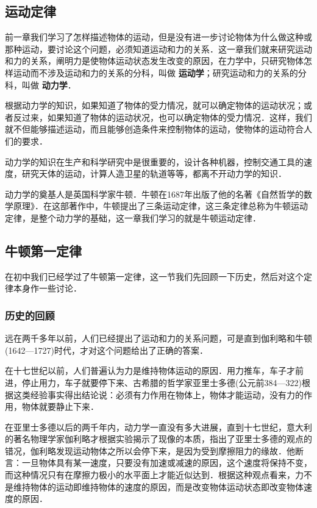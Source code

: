 
\begin{Test}

\chapter{运动定律}

前一章我们学习了怎样描述物体的运动，但是没有进一步讨论物体为什么做这种或那种运动，要讨论这个问题，必须知道运动和力的关系．这一章我们就来研究运动和力的关系，阐明力是使物体运动状态发生改变的原因，在力学中，只研究物体怎样运动而不涉及运动和力的关系的分科，叫做\textbf{ 运动学}；研究运动和力的关系的分科，叫做\textbf{ 动力学}．

根据动力学的知识，如果知道了物体的受力情况，就可以确定物体的运动状况；或者反过来，如果知道了物体的运动状况，也可以确定物体的受力情况．这样，我们就不但能够描述运动，而且能够创造条件来控制物体的运动，使物体的运动符合人们的要求．

动力学的知识在生产和科学研究中是很重要的，设计各种机器，控制交通工具的速度，研究天体的运动，计算人造卫星的轨道等等，都离不开动力学的知识．

动力学的奠基人是英国科学家牛顿．牛顿在1687年出版了他的名著《自然哲学的数学原理》．在这部著作中，牛顿提出了三条运动定律，这三条定律总称为牛顿运动定律，是整个动力学的基础，这一章我们学习的就是牛顿运动定律．

\section{牛顿第一定律}
在初中我们已经学过了牛顿第一定律，这一节我们先回顾一下历史，然后对这个定律本身作一些讨论．

\subsection{历史的回顾}
远在两千多年以前，人们已经提出了运动和力的关系问题，可是直到伽利略和牛顿(1642—1727)时代，才对这个问题给出了正确的答案．

在十七世纪以前，人们普遍认为力是维持物体运动的原因．用力推车，车子才前进，停止用力，车子就要停下来、古希腊的哲学家亚里士多德(公元前384—322)根据这类经验事实得出结论说：必须有力作用在物体上，物体才能运动，没有力的作用，物体就要静止下来．

在亚里士多德以后的两千年内，动力学一直没有多大进展，直到十七世纪，意大利的著名物理学家伽利略才根据实验揭示了现像的本质，指出了亚里士多德的观点的错况，伽利略发现运动物体之所以会停下来，是因为受到摩擦阻力的缘故．他断言：一旦物体具有某一速度，只要没有加速或减速的原因，这个速度将保持不变，而这种情况只有在摩擦力极小的水平面上才能近似达到．根据这种观点看来，力不是维持物体的运动即维持物体的速度的原因，而是改变物体运动状态即改变物体速度的原因．


\end{Test}
